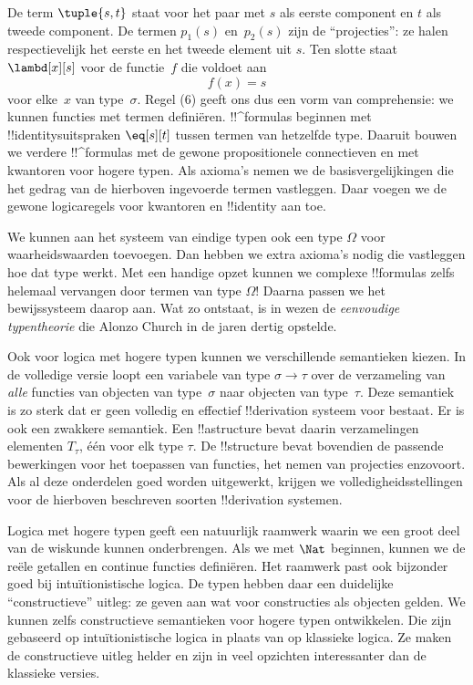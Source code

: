 \documentclass[openany]{memoir}
\begin{document}
De term $\tuple{s, t}$ staat voor het paar met $s$ als eerste component en
$t$ als tweede component. De termen $p_1(s)$ en~$p_2(s)$ zijn de
``projecties'': ze halen respectievelijk het eerste en het tweede element uit
$s$. Ten slotte staat $\lambd[x][s]$ voor de functie~$f$ die voldoet aan
\[
f(x) = s
\]
voor elke~$x$ van type~$\sigma$. Regel (6) geeft ons dus een vorm van
comprehensie: we kunnen functies met termen definiëren. !!^{formula}s beginnen
met !!{identity}suitspraken $\eq[s][t]$ tussen termen van hetzelfde type.
Daaruit bouwen we verdere !!^{formula}s met de gewone propositionele
connectieven en met kwantoren voor hogere typen. Als axioma's nemen we de
basisvergelijkingen die het gedrag van de hierboven ingevoerde termen
vastleggen. Daar voegen we de gewone logicaregels voor kwantoren en
!!{identity} aan toe.

We kunnen aan het systeem van eindige typen ook een type $\Omega$ voor
waarheidswaarden toevoegen. Dan hebben we extra axioma's nodig die vastleggen
hoe dat type werkt. Met een handige opzet kunnen we complexe !!{formula}s
zelfs helemaal vervangen door termen van type $\Omega$!{} Daarna passen we het
bewijssysteem daarop aan. Wat zo ontstaat, is in wezen de
\emph{eenvoudige typentheorie} die Alonzo Church in de jaren dertig opstelde.

Ook voor logica met hogere typen kunnen we verschillende semantieken kiezen.
In de volledige versie loopt een variabele van type $\sigma \to \tau$ over
de verzameling van
\emph{alle} functies van objecten van type~$\sigma$ naar objecten van
type~$\tau$. Deze semantiek is zo sterk dat er geen volledig en effectief
!!{derivation} systeem voor bestaat. Er is ook een zwakkere semantiek. Een
!!a{structure} bevat daarin verzamelingen elementen $T_\tau$, één voor elk
type $\tau$. De !!{structure} bevat bovendien de passende bewerkingen voor het
toepassen van functies, het nemen van projecties enzovoort. Als al deze
onderdelen goed worden uitgewerkt, krijgen we volledigheidsstellingen voor de
hierboven beschreven soorten !!{derivation} systemen.

Logica met hogere typen geeft een natuurlijk raamwerk waarin we een groot deel
van de wiskunde kunnen onderbrengen. Als we met $\Nat$ beginnen, kunnen we de
reële getallen en continue functies definiëren. Het raamwerk
past ook bijzonder goed bij intuïtionistische logica. De typen hebben daar een
duidelijke ``constructieve'' uitleg: ze geven aan wat voor constructies als
objecten gelden. We kunnen zelfs constructieve semantieken voor hogere typen
ontwikkelen. Die zijn gebaseerd op intuïtionistische logica in plaats van op
klassieke logica. Ze maken de constructieve uitleg helder en zijn in veel
opzichten interessanter dan de klassieke versies.
\endgroup
\end{document}
